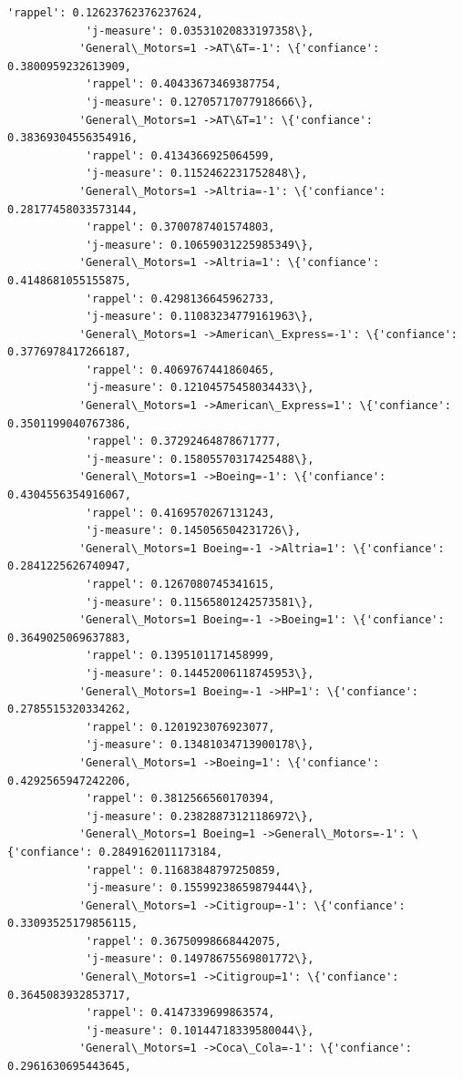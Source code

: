 \documentclass[11pt]{article}
\begin{document}
\begin{Verbatim}[commandchars=\\\{\}]
            'rappel': 0.12623762376237624,
            'j-measure': 0.03531020833197358\},
           'General\_Motors=1 ->AT\&T=-1': \{'confiance': 0.3800959232613909,
            'rappel': 0.40433673469387754,
            'j-measure': 0.12705717077918666\},
           'General\_Motors=1 ->AT\&T=1': \{'confiance': 0.38369304556354916,
            'rappel': 0.4134366925064599,
            'j-measure': 0.1152462231752848\},
           'General\_Motors=1 ->Altria=-1': \{'confiance': 0.28177458033573144,
            'rappel': 0.3700787401574803,
            'j-measure': 0.10659031225985349\},
           'General\_Motors=1 ->Altria=1': \{'confiance': 0.4148681055155875,
            'rappel': 0.4298136645962733,
            'j-measure': 0.11083234779161963\},
           'General\_Motors=1 ->American\_Express=-1': \{'confiance': 0.3776978417266187,
            'rappel': 0.4069767441860465,
            'j-measure': 0.12104575458034433\},
           'General\_Motors=1 ->American\_Express=1': \{'confiance': 0.3501199040767386,
            'rappel': 0.37292464878671777,
            'j-measure': 0.15805570317425488\},
           'General\_Motors=1 ->Boeing=-1': \{'confiance': 0.4304556354916067,
            'rappel': 0.4169570267131243,
            'j-measure': 0.145056504231726\},
           'General\_Motors=1 Boeing=-1 ->Altria=1': \{'confiance': 0.2841225626740947,
            'rappel': 0.1267080745341615,
            'j-measure': 0.11565801242573581\},
           'General\_Motors=1 Boeing=-1 ->Boeing=1': \{'confiance': 0.3649025069637883,
            'rappel': 0.1395101171458999,
            'j-measure': 0.14452006118745953\},
           'General\_Motors=1 Boeing=-1 ->HP=1': \{'confiance': 0.2785515320334262,
            'rappel': 0.1201923076923077,
            'j-measure': 0.13481034713900178\},
           'General\_Motors=1 ->Boeing=1': \{'confiance': 0.4292565947242206,
            'rappel': 0.3812566560170394,
            'j-measure': 0.23828873121186972\},
           'General\_Motors=1 Boeing=1 ->General\_Motors=-1': \{'confiance': 0.2849162011173184,
            'rappel': 0.11683848797250859,
            'j-measure': 0.15599238659879444\},
           'General\_Motors=1 ->Citigroup=-1': \{'confiance': 0.33093525179856115,
            'rappel': 0.36750998668442075,
            'j-measure': 0.14978675569801772\},
           'General\_Motors=1 ->Citigroup=1': \{'confiance': 0.3645083932853717,
            'rappel': 0.4147339699863574,
            'j-measure': 0.10144718339580044\},
           'General\_Motors=1 ->Coca\_Cola=-1': \{'confiance': 0.2961630695443645,

\end{Verbatim}
\end{document}
